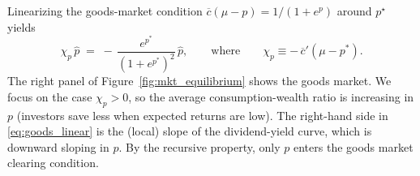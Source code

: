Linearizing the goods-market condition $\overline{c}(\mu-p)=1/(1+e^{p})$ around $p^\star$ yields
\begin{equation}\label{eq:goods_linear}
    \chi_p\,\hat{p}
    \;=\;
    -\,\frac{e^{p^{*}}}{(1+e^{p^{*}})^2}\,\hat{p},
    \qquad\text{where}\qquad
    \chi_p \equiv -\,\overline{c}'(\mu-p^{*}).
\end{equation}
The right panel of Figure~\ref{fig:mkt_equilibrium} shows the goods market.
We focus on the case $\chi_p>0$, so the average consumption-wealth ratio is increasing in $p$ (investors save less when expected returns are low).
The right-hand side in \eqref{eq:goods_linear} is the (local) slope of the dividend-yield curve, which is downward sloping in $p$.
By the recursive property, only $p$ enters the goods market clearing condition.



